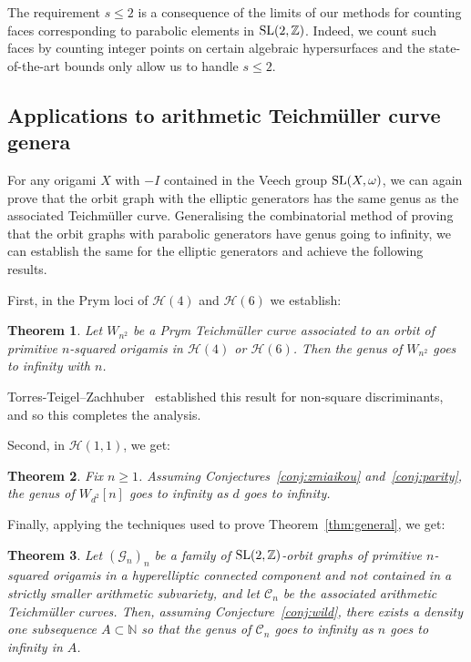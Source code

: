 \documentclass[a4paper,11pt]{amsart}
\numberwithin{equation}{section}
\numberwithin{figure}{section}
\numberwithin{table}{section}
\newtheorem{theorem}{Theorem}[section]
\newcommand{\teichmuller}{Teichm{\"u}ller }
\newcommand{\calH}{\mathcal{H}}
\newcommand{\Z}{\mathbb{Z}}
\newcommand{\N}{\mathbb{N}}
\DeclareMathOperator{\SL}{{\rm{SL}}}
\begin{document}
The requirement $s\leq 2$ is a consequence of the limits of our methods for counting faces corresponding to parabolic elements in $\SL(2,\Z)$. Indeed, we count such faces by counting integer points on certain algebraic hypersurfaces and the state-of-the-art bounds only allow us to handle $s\leq 2$.


\subsection{Applications to arithmetic \teichmuller curve genera}

For any origami $X$ with $-I$ contained in the Veech group $\SL(X,\omega)$, we can again prove that the orbit graph with the elliptic generators has the same genus as the associated \teichmuller curve. Generalising the combinatorial method of proving that the orbit graphs with parabolic generators have genus going to infinity, we can establish the same for the elliptic generators and achieve the following results.

First, in the Prym loci of $\calH(4)$ and $\calH(6)$ we establish:

\begin{theorem}\label{thm:prym-genus}
    Let $W_{n^{2}}$ be a Prym \teichmuller curve associated to an orbit of primitive $n$-squared origamis in $\calH(4)$ or $\calH(6)$. Then the genus of $W_{n^{2}}$ goes to infinity with $n$.
\end{theorem}

Torres-Teigel--Zachhuber~\cite{TTZ18,TTZ19} established this result for non-square discriminants, and so this completes the analysis.

Second, in $\calH(1,1)$, we get:

\begin{theorem}\label{thm:H(1,1)-genus}
    Fix $n\geq 1$. Assuming Conjectures~\ref{conj:zmiaikou} and~\ref{conj:parity}, the genus of $W_{d^{2}}[n]$ goes to infinity as $d$ goes to infinity.
\end{theorem}

Finally, applying the techniques used to prove Theorem~\ref{thm:general}, we get:

\begin{theorem}\label{thm:general-genus}
    Let $(\mathcal{G}_{n})_{n}$ be a family of $\SL(2,\Z)$-orbit graphs of primitive $n$-squared origamis in a hyperelliptic connected component and not contained in a strictly smaller arithmetic subvariety, and let $\mathcal{C}_{n}$ be the associated arithmetic \teichmuller curves. Then, assuming Conjecture~\ref{conj:wild}, there exists a density one subsequence $A\subset\N$ so that the genus of $\mathcal{C}_{n}$ goes to infinity as $n$ goes to infinity in $A$.
\end{theorem}
\end{document}
